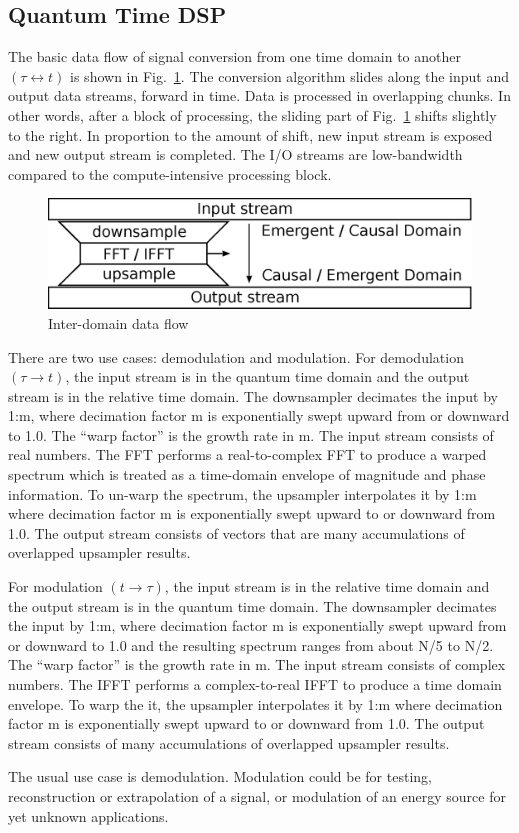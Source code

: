 \subsection{\label{sec:level1}Quantum Time DSP}

The basic data flow of signal conversion from one time domain to another
$(\tau \leftrightarrow t)$ is shown in Fig.~\ref{fig:sled}.
The conversion algorithm slides along the input and output data streams,
forward in time.
Data is processed in overlapping chunks.
In other words, after a block of processing,
the sliding part of Fig.~\ref{fig:sled} shifts slightly to the right.
In proportion to the amount of shift,
new input stream is exposed and new output stream is completed.
The I/O streams are low-bandwidth compared to the compute-intensive
processing block.

\begin{figure}
	\centering
	\includegraphics[width=0.95\linewidth]{../source/sled_e}
	\caption[Quantum to Relative Time Translation Flow]{Inter-domain data flow}
	\label{fig:sled}
\end{figure}

There are two use cases: demodulation and modulation.
For demodulation $(\tau \rightarrow t)$, the input stream is in the quantum
time domain and the output stream is in the relative time domain.
The downsampler decimates the input by 1:m, where decimation factor m is
exponentially swept upward from or downward to 1.0.
The ``warp factor'' is the growth rate in m.
The input stream consists of real numbers.
The FFT performs a real-to-complex FFT to produce a warped spectrum which is
treated as a time-domain envelope of magnitude and phase information.
To un-warp the spectrum, the upsampler interpolates it by 1:m where decimation
factor m is exponentially swept upward to or downward from 1.0.
The output stream consists of vectors that are many accumulations of overlapped
upsampler results.

For modulation $(t \rightarrow \tau)$, the input stream is in the relative time
domain and the output stream is in the quantum time domain. The downsampler
decimates the input by 1:m, where decimation factor m is exponentially swept
upward from or downward to 1.0 and the resulting spectrum ranges from about
N/5 to N/2.
The ``warp factor'' is the growth rate in m.
The input stream consists of complex numbers.
The IFFT performs a complex-to-real IFFT to produce a time domain
envelope. To warp the it, the upsampler interpolates it by 1:m
where decimation factor m is exponentially swept upward to or downward from 1.0.
The output stream consists of many accumulations of overlapped upsampler results.

The usual use case is demodulation.
Modulation could be for testing, reconstruction or extrapolation of a signal,
or modulation of an energy source for yet unknown applications.

